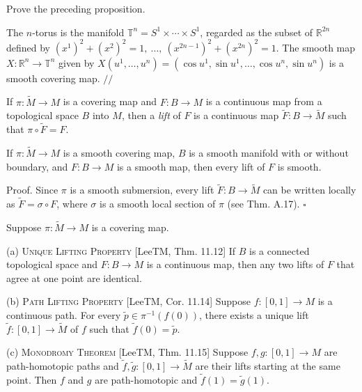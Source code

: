 \begin{exercise}
\label{exer:prove-prop-a50}
Prove the preceding proposition.
\end{exercise}

\begin{example}
\label{ex:covering-n-torus}
The $n$-torus is the manifold $\mathbb{T}^n = S^1 \times \cdots \times S^1$, regarded as the subset of $\mathbb{R}^{2n}$ defined by $(x^1)^2 + (x^2)^2 = 1,\ \ldots,\ (x^{2n-1})^2 + (x^{2n})^2 = 1$. The smooth map $X: \mathbb{R}^n \to \mathbb{T}^n$ given by $X(u^1, \ldots, u^n) = (\cos u^1, \sin u^1, \ldots, \cos u^n, \sin u^n)$ is a smooth covering map. $\mathbin{//}$
\end{example}

If $\pi: \tilde{M} \to M$ is a covering map and $F: B \to M$ is a continuous map from a topological space $B$ into $M$, then a \emph{lift} of $F$ is a continuous map $\tilde{F}: B \to \tilde{M}$ such that $\pi \circ \tilde{F} = F$.

\begin{proposition}
\label{prop:lifts-smooth-maps-smooth}
If $\pi: \tilde{M} \to M$ is a smooth covering map, $B$ is a smooth manifold with or without boundary, and $F: B \to M$ is a smooth map, then every lift of $F$ is smooth.

Proof. Since $\pi$ is a smooth submersion, every lift $\tilde{F}: B \to \tilde{M}$ can be written locally as $\tilde{F} = \sigma \circ F$, where $\sigma$ is a smooth local section of $\pi$ (see Thm. A.17). $\square$
\end{proposition}

\begin{proposition}
\label{prop:lifting-properties-covering}
Suppose $\pi: \tilde{M} \to M$ is a covering map.

(a) \textsc{Unique Lifting Property} [LeeTM, Thm. 11.12] If $B$ is a connected topological space and $F: B \to M$ is a continuous map, then any two lifts of $F$ that agree at one point are identical.

(b) \textsc{Path Lifting Property} [LeeTM, Cor. 11.14] Suppose $f: [0,1] \to M$ is a continuous path. For every $\tilde{p} \in \pi^{-1}(f(0))$, there exists a unique lift $\tilde{f}: [0,1] \to \tilde{M}$ of $f$ such that $\tilde{f}(0) = \tilde{p}$.

(c) \textsc{Monodromy Theorem} [LeeTM, Thm. 11.15] Suppose $f, g: [0,1] \to M$ are path-homotopic paths and $\tilde{f}, \tilde{g}: [0,1] \to \tilde{M}$ are their lifts starting at the same point. Then $f$ and $g$ are path-homotopic and $\tilde{f}(1) = \tilde{g}(1)$.
\end{proposition}

